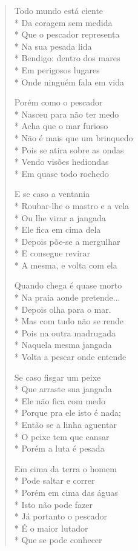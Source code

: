 \begin{verse}
Todo mundo está ciente\\*
Da coragem sem medida\\*
Que o pescador representa\\*
Na sua pesada lida\\*
Bendigo: dentro dos mares\\*
Em perigosos lugares\\*
Onde ninguém fala em vida

Porém como o pescador\\*
Nasceu para não ter medo\\*
Acha que o mar furioso\\*
Não é mais que um brinquedo\\*
Pois se atira sobre as ondas\\*
Vendo visões hediondas\\*
Em quase todo rochedo

E se caso a ventania\\*
Roubar-lhe o mastro e a vela\\*
Ou lhe virar a jangada\\*
Ele fica em cima dela\\*
Depois põe-se a mergulhar\\*
E consegue revirar\\*
A mesma, e volta com ela

Quando chega é quase morto\\*
Na praia aonde pretende...\\*
Depois olha para o mar.\\*
Mas com tudo não se rende\\*
Pois na outra madrugada\\*
Naquela mesma jangada\\*
Volta a pescar onde entende

Se caso fisgar um peixe\\*
Que arraste sua jangada\\*
Ele não fica com medo\\*
Porque pra ele isto é nada;\\*
Então se a linha aguentar\\*
O peixe tem que cansar\\*
Porém a luta é pesada

Em cima da terra o homem\\*
Pode saltar e correr\\*
Porém em cima das águas\\*
Isto não pode fazer\\*
Já portanto o pescador\\*
É o maior lutador\\*
Que se pode conhecer


\end{verse}
